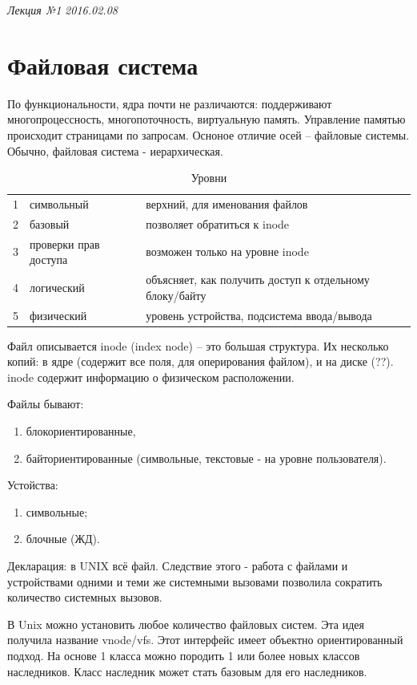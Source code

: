 \clearpage
\begin{flushright}
	\textit{Лекция №1}
	\textit{2016.02.08}
\end{flushright}

\chapter{Файловая система}
По функциональности, ядра почти не различаются: поддерживают многопроцессность, многопоточность, виртуальную память. Управление памятью происходит страницами по запросам. Осноное отличие осей – файловые системы. Обычно, файловая система - иерархическая.

\begin{table}[H]
\caption{Уровни}
\begin{tabular}{|l|l|l|}
\hline
1 & символьный & верхний, для именования файлов\\
2 & базовый & позволяет обратиться к inode\\
3 & проверки прав доступа & возможен только на уровне inode\\
4 & логический & объясняет, как получить доступ к отдельному  блоку/байту\\
5 & физический & уровень устройства, подсистема ввода/вывода\\
\hline
\end{tabular}
\end{table}

Файл описывается inode (index node) – это большая структура. Их несколько копий: в ядре (содержит все поля, для оперирования файлом), и на диске (??). inode содержит информацию о физическом расположении.


Файлы бывают:
\begin{enumerate}
\item блокориентированные,
\item байториентированные (символьные, текстовые - на уровне пользователя).
\end{enumerate}


Устойства:
\begin{enumerate}
\item символьные;
\item блочные (ЖД).
\end{enumerate}

Декларация: в UNIX всё файл. Следствие этого - работа с файлами и устройствами одними и теми же системными вызовами позволила сократить количество системных вызовов.

В Unix можно установить любое количество файловых систем. Эта идея получила название vnode/vfs. Этот интерфейс имеет объектно ориентированный подход. На основе 1 класса можно породить 1 или более новых классов наследников. Класс наследник может стать базовым для его наследников.

